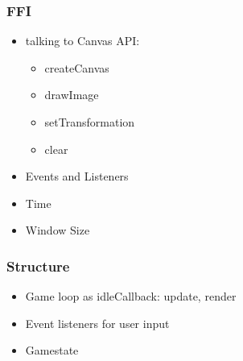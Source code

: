 \documentclass{beamer}
\begin{document}
	\begin{frame}
		\frametitle{FFI}
		\begin{itemize}
			\item talking to Canvas API:
			\begin{itemize}
				\item createCanvas
				\item drawImage
				\item setTransformation
				\item clear
			\end{itemize}
			\item Events and Listeners
			\item Time
			\item Window Size
		\end{itemize}
	\end{frame}
	
	\begin{frame}
		\frametitle{Structure}
		\begin{Large}
		\begin{itemize}
			\setlength{\itemsep}{.5em}
			\item Game loop as idleCallback: update, render
			\item Event listeners for user input
			\item Gamestate
		\end{itemize}
		\end{Large}
	\end{frame}
	
\end{document}
